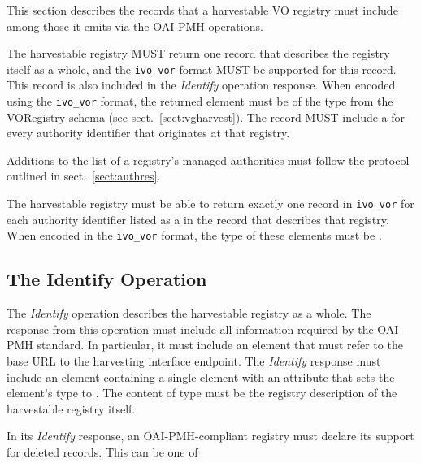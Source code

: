 \documentclass{ivoa}
\newcommand{\oaiop}[1]{\textit{#1}}
\begin{document}
This section describes the records that a harvestable VO registry
must include among those it emits via the OAI-PMH operations.

The harvestable registry MUST return one record that describes the
registry itself as a whole, and the \texttt{ivo\_vor}  format MUST be
supported for this record. This record is also included in the
\oaiop{Identify} operation response.  When encoded using the
\texttt{ivo\_vor} format, the returned  element must
be of the type  from the VORegistry schema
(see sect.~\ref{sect:vgharvest}). The
record MUST include a  for every authority
identifier that originates at that registry.

Additions to the list of a registry's managed authorities must follow
the protocol outlined in sect.~\ref{sect:authres}.

The harvestable registry must be able to return exactly one record in
\texttt{ivo\_vor}  for each authority identifier listed as a
 in the  record
that describes that registry. When encoded in the \texttt{ivo\_vor}
format, the type of these elements must be .


\subsection{The Identify Operation}

\label{sect:oaiidentify}

The \oaiop{Identify}  operation describes the harvestable registry as a
whole.  The response from this operation must include all information
required by the OAI-PMH standard. In particular, it must include an
 element that must refer to the base URL to the
harvesting interface endpoint.  The \oaiop{Identify}  response must
include an  element containing a single
 element with an  attribute that
sets the element's type to . The content of
 type must be the registry description of the
harvestable registry itself.

In its \oaiop{Identify} response, an OAI-PMH-compliant registry must
declare its support for deleted records.  This can be one of
\end{document}

